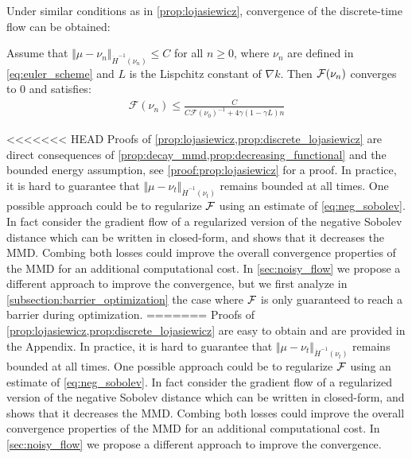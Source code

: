 Under similar conditions as in \cref{prop:lojasiewicz}, convergence of the discrete-time flow can be obtained:
\begin{proposition}\label{prop:discrete_lojasiewicz}
	Assume that $\Vert \mu - \nu_n \Vert_{\dot{H}^{-1}(\nu_n)} \leq C$ for all $n\geq 0$, where $\nu_n$ are defined in \cref{eq:euler_scheme} and $L$ is the Lispchitz constant of $\nabla k$. Then ${{\mathcal F}}(\nu_n)$ converges to $0$ and satisfies:
	\begin{align}
	\mathcal{F}(\nu_n)\leq \frac{C}{C\mathcal{F}(\nu_0)^{-1} + 4 \gamma(1-\gamma L) n}
	\end{align}
\end{proposition}
<<<<<<< HEAD
Proofs of \cref{prop:lojasiewicz,prop:discrete_lojasiewicz} are direct consequences of \cref{prop:decay_mmd,prop:decreasing_functional} and the bounded energy assumption, see  \cref{proof:prop:lojasiewicz} for a proof.
In practice, it is hard to guarantee that $\Vert \mu - \nu_t \Vert_{\dot{H}^{-1}(\nu_t)} $ remains bounded at all times. One possible approach could be to regularize ${{\mathcal F}}$ using an estimate of \cref{eq:neg_sobolev}. In fact \cite{Mroueh:2019} consider the gradient flow of a regularized version of the negative Sobolev distance which can be written in closed-form, and shows that it decreases the MMD. Combing both losses could improve the overall convergence properties of the MMD for an additional computational cost. In \cref{sec:noisy_flow} we propose a different approach to improve the convergence, but we first analyze in \cref{subsection:barrier_optimization} the case where ${{\mathcal F}}$ is only guaranteed to reach a barrier during optimization.
=======
Proofs of \cref{prop:lojasiewicz,prop:discrete_lojasiewicz} are easy to obtain and are provided in the Appendix. 
In practice, it is hard to guarantee that $\Vert \mu - \nu_t \Vert_{\dot{H}^{-1}(\nu_t)} $ remains bounded at all times. One possible approach could be to regularize ${{\mathcal F}}$ using an estimate of \cref{eq:neg_sobolev}. In fact \cite{Mroueh:2019} consider the gradient flow of a regularized version of the negative Sobolev distance which can be written in closed-form, and shows that it decreases the MMD. Combing both losses could improve the overall convergence properties of the MMD for an additional computational cost. In \cref{sec:noisy_flow} we propose a different approach to improve the convergence.%
